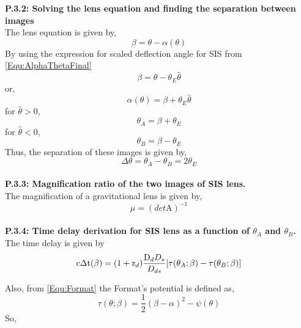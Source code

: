  \textbf{P.3.2: Solving the lens equation and finding the separation between images}\\
 
 The lens equation is given by,
 \begin{equation}
 \beta=\theta-\alpha(\theta)
 \end{equation}
 By using the expression for scaled deflection angle for SIS from \ref{Equ:AlphaThetaFinal}
 \begin{equation}
 \beta=\theta-\theta_{E}\hat{\theta}
 \end{equation}
 or, 
 \begin{equation*}
 \alpha(\theta)=\beta+\theta_{E}\hat{\theta}
 \end{equation*}
 for $ \hat{\theta}>0 $,
 \begin{equation*}
 \theta_{A}=\beta + \theta_{E}
 \label{Equ:ThetaA}
 \end{equation*}
 for $ \hat{\theta}<0 $,
 \begin{equation*}
 \theta_{B}=\beta -\theta_{E}
 \label{Equ:ThetaB}
 \end{equation*}
 Thus, the separation of these  images is given by,
 \begin{equation}
 \Delta\theta= \theta_{A}- \theta_{B} = 2\theta_{E}
 \label{math:imSep}
 \end{equation}
 \\
 
 \textbf{P.3.3: Magnification ratio of the two images of SIS lens.}\\
 
 The magnification of a gravitational lens is given by,
 \begin{equation}
 \mu=(det \text{A})^{-1}
 \end{equation}\\
 
 
 
 
 
 \textbf{P.3.4: Time delay derivation for SIS lens as a function of $ \theta_{A}$ and $ \theta_{B}$.}\\
 
 The time delay is given by\cite{manual}
 \begin{equation}
 \text{c}\Delta\text{t}(\beta)=(1+ \text{z}_{d})\frac{\text D_{d}D_{s}}{D_{ds}}[\tau(\theta_{A};\beta) - \tau(\theta_{B}; \beta)]
 \label{Equ:timeDelay}
 \end{equation}
 
 Also, from \ref{Equ:Format} the Format's potential is defined as,
 \begin{equation}
 \tau(\theta; \beta)=\frac{1}{2}(\beta -\alpha)^2 -\psi(\theta)
 \end{equation}
 So,
 
